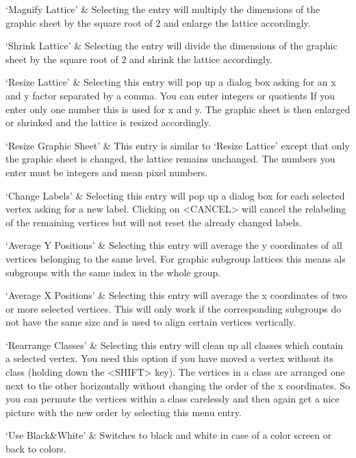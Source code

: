 `Magnify Lattice' & 
  Selecting the entry will multiply the dimensions of the graphic sheet by
  the square root of $2$ and enlarge the lattice accordingly.

`Shrink Lattice' &
  Selecting  the entry will divide the  dimensions  of the graphic sheet by 
  the square root of $2$ and shrink the lattice accordingly.

`Resize Lattice' &
Selecting this entry will pop up a dialog box asking for an x and y factor
separated by a comma.  You can enter integers or quotients If you enter
only one number this is used for x and y.  The graphic sheet is then
enlarged or shrinked and the lattice is resized accordingly.

`Resize Graphic Sheet' &
This  entry is similar to `Resize  Lattice' except that  only the graphic
sheet is changed, the lattice remains unchanged. The numbers you enter must 
be integers and mean pixel numbers.

`Change Labels' &
Selecting  this entry will pop  up a dialog  box for each selected vertex
asking for a new label.  Clicking on <CANCEL>  will cancel the relabeling
of the remaining vertices but will not reset the already changed labels.

`Average Y Positions' &
Selecting this entry will average the y coordinates of all vertices
belonging to the same level. For graphic subgroup lattices this means als
subgroups with the same index in the whole group.

`Average X Positions' &
Selecting this entry  will  average the x   coordinates  of two or   more
selected vertices.  This will only work if the corresponding subgroups do
not have the same size and is used to align certain vertices
vertically.

`Rearrange Classes' &
Selecting this entry will clean up all classes which contain a selected
vertex. You need this option if you have moved a vertex without its class
(holding down the <SHIFT> key). The vertices in a class are arranged one
next to the other horizontally without changing the order of the x
coordinates. So you can permute the vertices within a class carelessly and
then again get a nice picture with the new order by selecting this menu
entry.

`Use Black\&White' &
Switches to black and white in case of a color screen or back to colors.
\enditems


